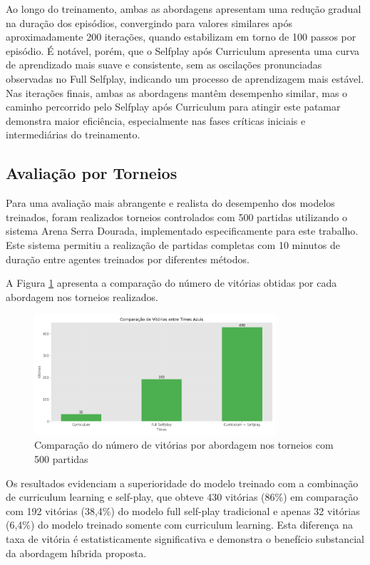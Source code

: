 Ao longo do treinamento, ambas as abordagens apresentam uma redução gradual na duração dos episódios, convergindo para valores similares após aproximadamente 200 iterações, quando estabilizam em torno de 100 passos por episódio. É notável, porém, que o Selfplay após Curriculum apresenta uma curva de aprendizado mais suave e consistente, sem as oscilações pronunciadas observadas no Full Selfplay, indicando um processo de aprendizagem mais estável. Nas iterações finais, ambas as abordagens mantêm desempenho similar, mas o caminho percorrido pelo Selfplay após Curriculum para atingir este patamar demonstra maior eficiência, especialmente nas fases críticas iniciais e intermediárias do treinamento.

\subsection{Avaliação por Torneios}

Para uma avaliação mais abrangente e realista do desempenho dos modelos treinados, foram realizados torneios controlados com 500 partidas utilizando o sistema Arena Serra Dourada, implementado especificamente para este trabalho. Este sistema permitiu a realização de partidas completas com 10 minutos de duração entre agentes treinados por diferentes métodos.

A Figura \ref{fig:comparacao_vitorias} apresenta a comparação do número de vitórias obtidas por cada abordagem nos torneios realizados.

\begin{figure}[H]
    \centering
    \includegraphics[width=0.8\textwidth]{fig/graficos_trabalho/graficos_torneios/geral/comparacao_vitorias.png}
    \caption{Comparação do número de vitórias por abordagem nos torneios com 500 partidas}
    \label{fig:comparacao_vitorias}
\end{figure}

Os resultados evidenciam a superioridade do modelo treinado com a combinação de curriculum learning e self-play, que obteve 430 vitórias (86\%) em comparação com 192 vitórias (38,4\%) do modelo full self-play tradicional e apenas 32 vitórias (6,4\%) do modelo treinado somente com curriculum learning. Esta diferença na taxa de vitória é estatisticamente significativa e demonstra o benefício substancial da abordagem híbrida proposta.

